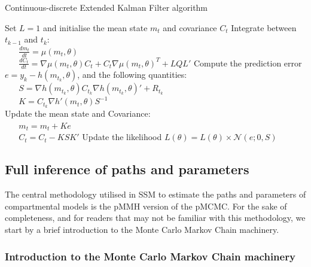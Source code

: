 \documentclass[a4paper,11pt,titlepage]{article}
\theoremstyle{plain} %
\begin{document}
\begin{algorithm}
\caption{Continuous-discrete Extended Kalman Filter algorithm}
\label{alg:EKF}
{\fontsize{12}{20}\selectfont
\begin{algorithmic}
\STATE Set $L=1$ and initialise the mean state $m_t$ and covariance $C_t$
	\STATE Integrate between $t_{k-1}$ and $t_{k}$:\\
		$\;\;\;\;\;\;\frac{dm_t}{dt}=\mu(m_t,\theta)$\\
		$\;\;\;\;\;\;\frac{dC_t}{dt}=\nabla\mu(m_t,\theta)C_t + C_t \nabla\mu(m_t,\theta)^T+LQL'$
	\STATE Compute the prediction error $e = y_{k}- h(m_{t_{k}},\theta)$, and the following quantities:\\
		$\;\;\;\;\;\;S=\nabla h(m_{t_{k}},\theta) C_{t_k} \nabla h(m_{t_{k}},\theta)'+R_{t_k}$	\\
		$\;\;\;\;\;\;K=C_{t_k}\nabla h'(m_t,\theta)S^{-1}$\\
	\STATE Update the mean state and Covariance:\\
		$\;\;\;\;\;\;m_t = m_t + K e$\\
		$\;\;\;\;\;\;C_t = C_t - KSK'$	
	\STATE Update the likelihood $L(\theta) = L(\theta)\times\mathcal{N}(e;0,S)$
\ENDFOR		
\end{algorithmic}
}
\end{algorithm}

\subsection{Full inference of paths and parameters}

The central methodology utilised in SSM to estimate the paths and parameters of compartmental models is the pMMH version of the pMCMC. For the sake of completeness, and for readers that may not be familiar with this methodology, we start by a brief introduction to the Monte Carlo Markov Chain machinery.

\subsubsection{Introduction to the Monte Carlo Markov Chain machinery}
\end{document}
